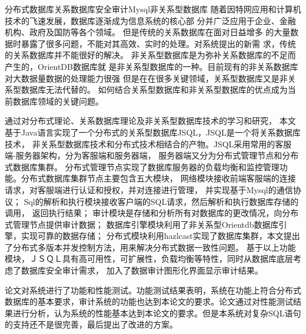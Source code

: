 
\begin{Cabstract}{分布式数据库}{关系数据库}{安全审计}{Mysql}{非关系型数据库}
随着因特网应用和计算机技术的飞速发展，数据库逐渐成为信息系统的核心部
分并广泛应用于企业、金融机构、政府及国防等各个领域。
但是传统的关系数据库在面对日益增多
的大量数据时暴露了很多问题，不能对其高效、实时的处理。对系统提出的新需
求，传统的关系数据库并不能很好的解决。
非关系型数据库是为弥补关系数据库的不足而产生的，OrientDB数据库就
是非关系型数据库的一种。目前现有的非关系数据库对大数据量数据的处理能力很强
但是在在很多关键领域，关系型数据库又是非关系型数据库无法代替的。
如何结合关系型数据库和非关系型数据库的优点成为当前数据库领域的关键问题。

通过对分布式理论、关系数据库理论及非关系型数据库技术的学习和研究，
本文基于Java语言实现了一个分布式的关系型数据库JSQL，JSQL是一个将关系数据库技术，
非关系型数据库技术和分布式技术相结合的产物。JSQL采用常用的客服端-服务器架构，分为客服端和服务器端，
服务器端又分为分布式管理节点和分布式数据库集群。
分布式管理节点实现了数据库服务器的负载均衡和监控管理功能。分布式数据库集群节点主要包含五大模块，
网络模块接收前端客服端的连接请求，对客服端进行认证和授权，并对连接进行管理，
并实现基于Mysql的通信协议；
Sql的解析和执行模块接收客户端的SQL请求，然后解析和执行数据库存储的调用，
返回执行结果；
审计模块是存储和分析所有对数据库的更改情况，向分布式管理节点提供审计数据；
数据库引擎模块利用了非关系型Orientdb数据库引擎，实现可靠的数据存储；
分布式模块利用hazlcast实现了数据库集群，本文提出了分布式多版本并发控制方法，用来解决分布式数据一致性问题。
基于以上功能模块，ＪＳＱＬ具有高可用性，可扩展性，负载均衡等特性，同时从数据库底层考虑了数据库安全审计需求，
加入了数据审计图形化界面显示审计结果。

论文对系统进行了功能和性能测试。功能测试结果表明，系统在功能上符合分布式数据库的基本要求，审计系统的功能也达到本论文的要求。论文通过对性能测试结果进行分析，认为系统的性能基本达到本论文的要求。但是本系统对复杂SQL语句的支持还不是很完善，最后提出了改进的方案。
\end{Cabstract}